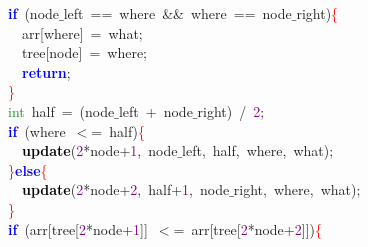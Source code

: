 {{\mbox{}\ \ \textbf{\textcolor{Blue}{if}}\ \textcolor{BrickRed}{(}node$\_$left\ \textcolor{BrickRed}{==}\ where\ \textcolor{BrickRed}{\&\&}\ where\ \textcolor{BrickRed}{==}\ node$\_$right\textcolor{BrickRed}{)}\textcolor{Red}{\{} \\
\mbox{}\ \ \ \ arr\textcolor{BrickRed}{[}where\textcolor{BrickRed}{]}\ \textcolor{BrickRed}{=}\ what\textcolor{BrickRed}{;} \\
\mbox{}\ \ \ \ tree\textcolor{BrickRed}{[}node\textcolor{BrickRed}{]}\ \textcolor{BrickRed}{=}\ where\textcolor{BrickRed}{;} \\
\mbox{}\ \ \ \ \textbf{\textcolor{Blue}{return}}\textcolor{BrickRed}{;} \\
\mbox{}\ \ \textcolor{Red}{\}} \\
\mbox{}\ \ \textcolor{ForestGreen}{int}\ half\ \textcolor{BrickRed}{=}\ \textcolor{BrickRed}{(}node$\_$left\ \textcolor{BrickRed}{+}\ node$\_$right\textcolor{BrickRed}{)}\ \textcolor{BrickRed}{/}\ \textcolor{Purple}{2}\textcolor{BrickRed}{;} \\
\mbox{}\ \ \textbf{\textcolor{Blue}{if}}\ \textcolor{BrickRed}{(}where\ \textcolor{BrickRed}{$<$=}\ half\textcolor{BrickRed}{)}\textcolor{Red}{\{} \\
\mbox{}\ \ \ \ \textbf{\textcolor{Black}{update}}\textcolor{BrickRed}{(}\textcolor{Purple}{2}\textcolor{BrickRed}{*}node\textcolor{BrickRed}{+}\textcolor{Purple}{1}\textcolor{BrickRed}{,}\ node$\_$left\textcolor{BrickRed}{,}\ half\textcolor{BrickRed}{,}\ where\textcolor{BrickRed}{,}\ what\textcolor{BrickRed}{);} \\
\mbox{}\ \ \textcolor{Red}{\}}\textbf{\textcolor{Blue}{else}}\textcolor{Red}{\{} \\
\mbox{}\ \ \ \ \textbf{\textcolor{Black}{update}}\textcolor{BrickRed}{(}\textcolor{Purple}{2}\textcolor{BrickRed}{*}node\textcolor{BrickRed}{+}\textcolor{Purple}{2}\textcolor{BrickRed}{,}\ half\textcolor{BrickRed}{+}\textcolor{Purple}{1}\textcolor{BrickRed}{,}\ node$\_$right\textcolor{BrickRed}{,}\ where\textcolor{BrickRed}{,}\ what\textcolor{BrickRed}{);} \\
\mbox{}\ \ \textcolor{Red}{\}} \\
\mbox{}\ \ \textbf{\textcolor{Blue}{if}}\ \textcolor{BrickRed}{(}arr\textcolor{BrickRed}{[}tree\textcolor{BrickRed}{[}\textcolor{Purple}{2}\textcolor{BrickRed}{*}node\textcolor{BrickRed}{+}\textcolor{Purple}{1}\textcolor{BrickRed}{]]}\ \textcolor{BrickRed}{$<$=}\ arr\textcolor{BrickRed}{[}tree\textcolor{BrickRed}{[}\textcolor{Purple}{2}\textcolor{BrickRed}{*}node\textcolor{BrickRed}{+}\textcolor{Purple}{2}\textcolor{BrickRed}{]])}\textcolor{Red}{\{} \\
}}
